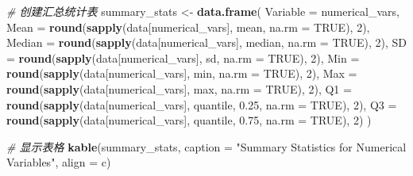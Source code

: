 \documentclass[
]{article}
\newenvironment{Shaded}{\begin{snugshade}}{\end{snugshade}}
\newcommand{\AttributeTok}[1]{\textcolor[rgb]{0.13,0.29,0.53}{#1}}
\newcommand{\CommentTok}[1]{\textcolor[rgb]{0.56,0.35,0.01}{\textit{#1}}}
\newcommand{\ConstantTok}[1]{\textcolor[rgb]{0.56,0.35,0.01}{#1}}
\newcommand{\DecValTok}[1]{\textcolor[rgb]{0.00,0.00,0.81}{#1}}
\newcommand{\FloatTok}[1]{\textcolor[rgb]{0.00,0.00,0.81}{#1}}
\newcommand{\FunctionTok}[1]{\textcolor[rgb]{0.13,0.29,0.53}{\textbf{#1}}}
\newcommand{\NormalTok}[1]{#1}
\newcommand{\OtherTok}[1]{\textcolor[rgb]{0.56,0.35,0.01}{#1}}
\newcommand{\StringTok}[1]{\textcolor[rgb]{0.31,0.60,0.02}{#1}}
\begin{document}
\begin{Shaded}
\begin{Highlighting}[]
\CommentTok{\# 创建汇总统计表}
\NormalTok{summary\_stats }\OtherTok{\textless{}{-}} \FunctionTok{data.frame}\NormalTok{(}
  \AttributeTok{Variable =}\NormalTok{ numerical\_vars,}
  \AttributeTok{Mean =} \FunctionTok{round}\NormalTok{(}\FunctionTok{sapply}\NormalTok{(data[numerical\_vars], mean, }\AttributeTok{na.rm =} \ConstantTok{TRUE}\NormalTok{), }\DecValTok{2}\NormalTok{),}
  \AttributeTok{Median =} \FunctionTok{round}\NormalTok{(}\FunctionTok{sapply}\NormalTok{(data[numerical\_vars], median, }\AttributeTok{na.rm =} \ConstantTok{TRUE}\NormalTok{), }\DecValTok{2}\NormalTok{),}
  \AttributeTok{SD =} \FunctionTok{round}\NormalTok{(}\FunctionTok{sapply}\NormalTok{(data[numerical\_vars], sd, }\AttributeTok{na.rm =} \ConstantTok{TRUE}\NormalTok{), }\DecValTok{2}\NormalTok{),}
  \AttributeTok{Min =} \FunctionTok{round}\NormalTok{(}\FunctionTok{sapply}\NormalTok{(data[numerical\_vars], min, }\AttributeTok{na.rm =} \ConstantTok{TRUE}\NormalTok{), }\DecValTok{2}\NormalTok{),}
  \AttributeTok{Max =} \FunctionTok{round}\NormalTok{(}\FunctionTok{sapply}\NormalTok{(data[numerical\_vars], max, }\AttributeTok{na.rm =} \ConstantTok{TRUE}\NormalTok{), }\DecValTok{2}\NormalTok{),}
  \AttributeTok{Q1 =} \FunctionTok{round}\NormalTok{(}\FunctionTok{sapply}\NormalTok{(data[numerical\_vars], quantile, }\FloatTok{0.25}\NormalTok{, }\AttributeTok{na.rm =} \ConstantTok{TRUE}\NormalTok{), }\DecValTok{2}\NormalTok{),}
  \AttributeTok{Q3 =} \FunctionTok{round}\NormalTok{(}\FunctionTok{sapply}\NormalTok{(data[numerical\_vars], quantile, }\FloatTok{0.75}\NormalTok{, }\AttributeTok{na.rm =} \ConstantTok{TRUE}\NormalTok{), }\DecValTok{2}\NormalTok{)}
\NormalTok{)}

\CommentTok{\# 显示表格}
\FunctionTok{kable}\NormalTok{(summary\_stats, }
      \AttributeTok{caption =} \StringTok{"Summary Statistics for Numerical Variables"}\NormalTok{,}
      \AttributeTok{align =} \StringTok{\textquotesingle{}c\textquotesingle{}}\NormalTok{)}
\end{Highlighting}
\end{Shaded}
\end{document}
